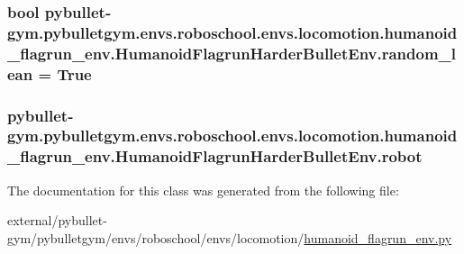 \subsubsection[{\texorpdfstring{random\+\_\+lean}{random_lean}}]{\setlength{\rightskip}{0pt plus 5cm}bool pybullet-\/gym.\+pybulletgym.\+envs.\+roboschool.\+envs.\+locomotion.\+humanoid\+\_\+flagrun\+\_\+env.\+Humanoid\+Flagrun\+Harder\+Bullet\+Env.\+random\+\_\+lean = True\hspace{0.3cm}{\ttfamily [static]}}\hypertarget{classpybullet-gym_1_1pybulletgym_1_1envs_1_1roboschool_1_1envs_1_1locomotion_1_1humanoid__flagrudb0b09e2e64c56870b184e16ccd9ae79_a6977ae88fea08a3f15de1f36cb5775fc}{}\label{classpybullet-gym_1_1pybulletgym_1_1envs_1_1roboschool_1_1envs_1_1locomotion_1_1humanoid__flagrudb0b09e2e64c56870b184e16ccd9ae79_a6977ae88fea08a3f15de1f36cb5775fc}
\subsubsection[{\texorpdfstring{robot}{robot}}]{\setlength{\rightskip}{0pt plus 5cm}pybullet-\/gym.\+pybulletgym.\+envs.\+roboschool.\+envs.\+locomotion.\+humanoid\+\_\+flagrun\+\_\+env.\+Humanoid\+Flagrun\+Harder\+Bullet\+Env.\+robot}\hypertarget{classpybullet-gym_1_1pybulletgym_1_1envs_1_1roboschool_1_1envs_1_1locomotion_1_1humanoid__flagrudb0b09e2e64c56870b184e16ccd9ae79_a266834a5a35982189902fef56ece8092}{}\label{classpybullet-gym_1_1pybulletgym_1_1envs_1_1roboschool_1_1envs_1_1locomotion_1_1humanoid__flagrudb0b09e2e64c56870b184e16ccd9ae79_a266834a5a35982189902fef56ece8092}


The documentation for this class was generated from the following file\+:\begin{DoxyCompactItemize}
\item 
external/pybullet-\/gym/pybulletgym/envs/roboschool/envs/locomotion/\hyperlink{humanoid__flagrun__env_8py}{humanoid\+\_\+flagrun\+\_\+env.\+py}\end{DoxyCompactItemize}
